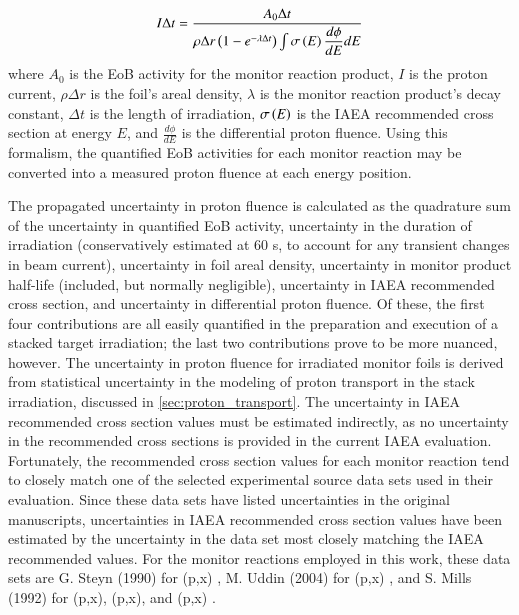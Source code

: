 \begin{equation}
I \Delta t = \dfrac{A_0 \Delta t}{\rho \Delta r \left( 1-e^{-\lambda \Delta t}\right) \int \sigma\left( E\right) \dfrac{d\phi}{dE} dE}
\end{equation}
where $A_0$ is the EoB activity for the monitor reaction product, $I$ is the proton current, $\rho \Delta r$ is the foil's areal density, $\lambda$ is the monitor reaction product's decay constant, $\Delta t$ is the length of irradiation, $\sigma\left( E\right)$ is the IAEA recommended cross section at energy $E$, and $\frac{d\phi}{dE}$ is the differential proton fluence.
Using this formalism, the quantified EoB activities for each monitor reaction may be converted into a measured proton fluence at each energy position.



The propagated uncertainty in proton fluence is calculated as the quadrature sum of the uncertainty in quantified EoB activity, uncertainty in the duration of irradiation (conservatively estimated at 60 s, to account for any transient changes in beam current), uncertainty in foil areal density, uncertainty in monitor product half-life (included, but normally negligible), uncertainty in IAEA recommended cross section, and uncertainty in differential proton fluence.
Of these, the first four contributions are all easily quantified in the preparation and execution of a stacked target irradiation;  the last two contributions prove to be more nuanced, however.
The uncertainty in proton fluence for irradiated monitor foils is derived from statistical uncertainty in the modeling of proton transport in the stack irradiation, discussed in \autoref{sec:proton_transport}.
The uncertainty in IAEA recommended cross section values must be estimated indirectly, as no uncertainty in the  recommended cross sections is provided in the current IAEA evaluation.
Fortunately, the recommended cross section values for each monitor reaction tend to closely match one of the   selected experimental source data sets used in their evaluation.
Since these data sets have listed uncertainties in the original manuscripts, uncertainties in  IAEA recommended cross section values have been estimated by the uncertainty in the data set most closely matching the  IAEA recommended  values.
For the monitor reactions employed in this work, these data sets are G. Steyn (1990) for  (p,x) \cite{Steyn1990}, M. Uddin (2004) for (p,x) \cite{Uddin2004}, and S. Mills (1992) for (p,x), (p,x), and (p,x) \cite{Mills1992}.





